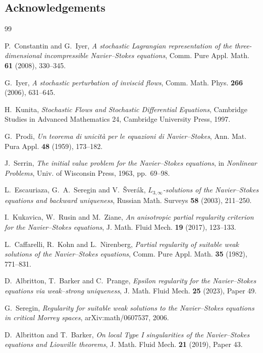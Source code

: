 \documentclass[11pt,reqno]{amsart}
\theoremstyle{definition}
\begin{document}
\subsection*{Acknowledgements}

\begin{thebibliography}{99}

P.~Constantin and G.~Iyer,
\emph{A stochastic Lagrangian representation of the three-dimensional incompressible
Navier--Stokes equations},
Comm. Pure Appl. Math. \textbf{61} (2008), 330--345.

G.~Iyer,
\emph{A stochastic perturbation of inviscid flows},
Comm. Math. Phys. \textbf{266} (2006), 631--645.

H.~Kunita,
\emph{Stochastic Flows and Stochastic Differential Equations},
Cambridge Studies in Advanced Mathematics 24, Cambridge University Press, 1997.

G.~Prodi,
\emph{Un teorema di unicit\`a per le equazioni di Navier--Stokes},
Ann. Mat. Pura Appl. \textbf{48} (1959), 173--182.

J.~Serrin,
\emph{The initial value problem for the Navier--Stokes equations},
in \emph{Nonlinear Problems}, Univ. of Wisconsin Press, 1963, pp.~69--98.

L.~Escauriaza, G.~A.~Seregin and V.~{\v S}ver\'ak,
\emph{$L_{3,\infty}$-solutions of the Navier--Stokes equations and backward uniqueness},
Russian Math. Surveys \textbf{58} (2003), 211--250.

I.~Kukavica, W.~Rusin and M.~Ziane,
\emph{An anisotropic partial regularity criterion for the Navier--Stokes equations},
J. Math. Fluid Mech. \textbf{19} (2017), 123--133.

L.~Caffarelli, R.~Kohn and L.~Nirenberg,
\emph{Partial regularity of suitable weak solutions of the Navier--Stokes equations},
Comm. Pure Appl. Math. \textbf{35} (1982), 771--831.

D.~Albritton, T.~Barker and C.~Prange,
\emph{Epsilon regularity for the Navier--Stokes equations via weak--strong uniqueness},
J. Math. Fluid Mech. \textbf{25} (2023), Paper 49.

G.~Seregin,
\emph{Regularity for suitable weak solutions to the Navier--Stokes equations in critical
Morrey spaces}, arXiv:math/0607537, 2006.

D.~Albritton and T.~Barker,
\emph{On local Type I singularities of the Navier--Stokes equations and Liouville
theorems}, J. Math. Fluid Mech. \textbf{21} (2019), Paper 43.

\end{thebibliography}
\end{document}
